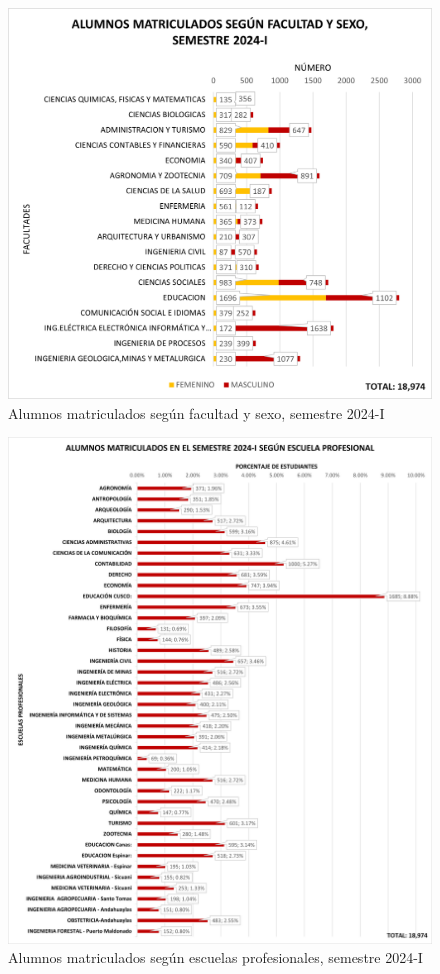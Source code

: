 \documentclass[
  12pt,
  letterpaper,
]{scrreprt}
\begin{document}
\begin{figure}[H]

\caption{Alumnos matriculados según facultad y sexo, semestre 2024-I}

{\centering \includegraphics{imagen/imagen4.png}

}

\end{figure}%
\begin{figure}[H]

\caption{Alumnos matriculados según escuelas profesionales, semestre
2024-I}

{\centering \includegraphics{imagen/imagen2.png}

}

\end{figure}%
\end{document}
